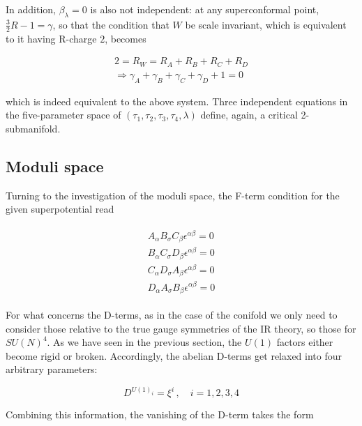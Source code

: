 In addition, $\beta_\lambda = 0$ is also not independent: at any superconformal point, $\frac{3}{2}R - 1 = \gamma$, so that the condition that $W$ be scale invariant, which is equivalent to it having R-charge $2$, becomes

\begin{equation}
	\begin{split}
	2 = R_W = R_A + R_B + R_C + R_D \\\Rightarrow \gamma_A + \gamma_B + \gamma_C + \gamma_D + 1 = 0
	\label{}
\end{split}
\end{equation}

which is indeed equivalent to the above system. Three independent equations in the five-parameter space of $(\tau_1,\tau_2,\tau_3,\tau_4,\lambda)$ define, again, a critical 2-submanifold.

\subsection{Moduli space}\label{sec:squaresmoduli}

Turning to the investigation of the moduli space, the F-term condition for the given superpotential read

\begin{align}
	\begin{split}
	A_\alpha B_\sigma C_\beta \epsilon^{\alpha\beta} = 0 \\
	B_\alpha C_\sigma D_\beta \epsilon^{\alpha\beta} = 0 \\
	C_\alpha D_\sigma A_\beta \epsilon^{\alpha\beta} = 0 \\
	D_\alpha A_\sigma B_\beta \epsilon^{\alpha\beta} = 0 
	\label{Ftermssquare}
\end{split}
\end{align}

For what concerns the D-terms, as in the case of the conifold we only need to consider those relative to the true gauge symmetries of the IR theory, so those for $SU(N)^4$. As we have seen in the previous section, the $U(1)$ factors either become rigid or broken. Accordingly, the abelian D-terms get relaxed into four arbitrary parameters:

\begin{equation}
	D^{U(1)_i} = \xi^i\,,\quad i = 1,2,3,4
	\label{}
\end{equation}

Combining this information, the vanishing of the D-term takes the form

